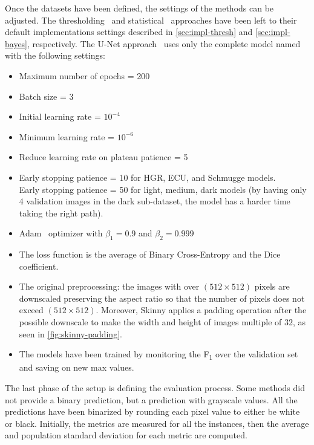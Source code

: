 Once the datasets have been defined, the settings of the methods can be adjusted.
The thresholding~\cite{brancati2017human} and statistical~\cite{acharjee2018skin} approaches have been left to their default implementations settings described in \autoref{sec:impl-thresh} and \autoref{sec:impl-bayes}, respectively.
The U-Net approach~\cite{tarasiewicz2020skinny} uses only the complete model named  with the following settings:
\begin{itemize}
    \item Maximum number of epochs = 200
    \item Batch size = 3
    \item Initial learning rate = $10^{-4}$
    \item Minimum learning rate = $10^{-6}$
    \item Reduce learning rate on plateau patience = 5
    \item Early stopping patience = 10 for HGR, ECU, and Schmugge models.\\
    Early stopping patience = 50 for light, medium, dark models (by having only 4 validation images in the dark sub-dataset, the model has a harder time taking the right path).
    \item Adam~\cite{kingma2014adam} optimizer with $\beta_1 = 0.9$ and $\beta_2 = 0.999$
    \item The loss function is the average of Binary Cross-Entropy and the Dice coefficient.
    \item The original preprocessing: the images with over $(512 \times 512)$ pixels are downscaled preserving the aspect ratio so that the number of pixels does not exceed $(512 \times 512)$. Moreover, Skinny applies a padding operation after the possible downscale to make the width and height of images multiple of 32, as seen in \autoref{fig:skinny-padding}.
    \item The models have been trained by monitoring the F\textsubscript{1} over the validation set and saving on new max values.
\end{itemize}


\noindent The last phase of the setup is defining the evaluation process.
Some methods did not provide a binary prediction, but a prediction with grayscale values. All the predictions have been binarized by rounding each pixel value to either be white or black.
Initially, the metrics are measured for all the instances, then the average and population standard deviation for each metric are computed.


